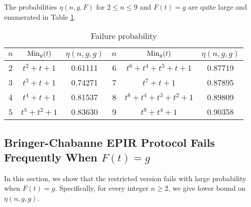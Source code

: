 \documentclass[JMC]{degruyter-journal}
\begin{document}
The   probabilities $\eta(n,g,F)$ for $2\leq n\leq 9$ and $F(t)=g$
are quite large and  enumerated in Table \ref{table:failprob}.
\begin{table}[ghp]
\begin{center}
\begin{tabular}{|c|c|c||c|c|c|}\hline
$n$ & ${\rm Min}_g(t)$   & $\eta(n,g,g)$  & $n$ & ${\rm Min}_g(t)$   & $\eta(n,g,g)$
\\ \hline \hline
2 & $t^2+t+1$    &0.61111    & 6 & $t^6+t^4+t^3+t+1$          & 0.87719         \\ \hline
3 & $t^3+t+1$    & 0.74271   & 7 & $t^7+t+1$                        & 0.87895   \\ \hline
4 & $t^4+t+1$    & 0.81537   & 8 & $t^8+t^4+t^3+t^2+1$      & 0.89809           \\ \hline
5 & $t^5+t^2+1$  & 0.83630   & 9 & $t^9+t^4+1$                    & 0.90358     \\ \hline
\end{tabular}
\end{center}
\caption{Failure probability}
\label{table:failprob}
\end{table}





\subsection{Bringer-Chabanne EPIR Protocol Fails Frequently When $F(t)=g$}\label{sec:BC_EPIR_fails_frequently_for_g}

In this section, we show that the restricted version  fails with large
probability when $F(t)=g$. Specifically, for every integer $n\geq
2$, we give lower bound on $\eta(n,g,g)$.
\end{document}
